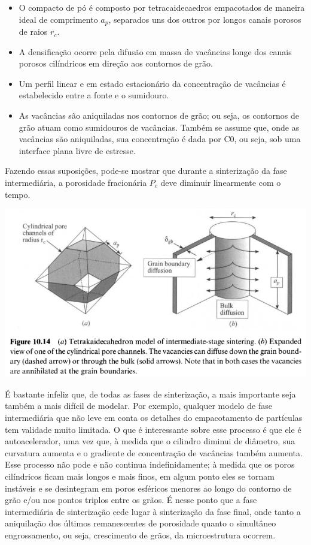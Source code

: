 \begin{itemize}
    \item O compacto de pó é composto por tetracaidecaedros empacotados de maneira ideal de comprimento $a_p$, separados uns dos outros por longos canais porosos de raios $r_c$.
    \item A densificação ocorre pela difusão em massa de vacâncias longe dos canais porosos cilíndricos em direção aos contornos de grão.
    \item Um perfil linear e em estado estacionário da concentração de vacâncias é estabelecido entre a fonte e o sumidouro.
    \item As vacâncias são aniquiladas nos contornos de grão; ou seja, os contornos de grão atuam como sumidouros de vacâncias. Também se assume que, onde as vacâncias são aniquiladas, sua concentração é dada por C0, ou seja, sob uma interface plana livre de estresse.
\end{itemize}

Fazendo essas suposições, pode-se mostrar que durante a sinterização da fase intermediária, a porosidade fracionária $P_c$ deve diminuir linearmente com o tempo.

\includegraphics*[width=\linewidth]{./images/estagio_intermediario_densificacao.png}

É bastante infeliz que, de todas as fases de sinterização, a mais importante seja também a mais difícil de modelar. Por exemplo, qualquer modelo de fase intermediária que não leve em conta os detalhes do empacotamento de partículas tem validade muito limitada. O que é interessante sobre esse processo é que ele é autoacelerador, uma vez que, à medida que o cilindro diminui de diâmetro, sua curvatura aumenta e o gradiente de concentração de vacâncias também aumenta. Esse processo não pode e não continua indefinidamente; à medida que os poros cilíndricos ficam mais longos e mais finos, em algum ponto eles se tornam instáveis e se desintegram em poros esféricos menores ao longo do contorno de grão e/ou nos pontos triplos entre os grãos. É nesse ponto que a fase intermediária de sinterização cede lugar à sinterização da fase final, onde tanto a aniquilação dos últimos remanescentes de porosidade quanto o simultâneo engrossamento, ou seja, crescimento de grãos, da microestrutura ocorrem.

